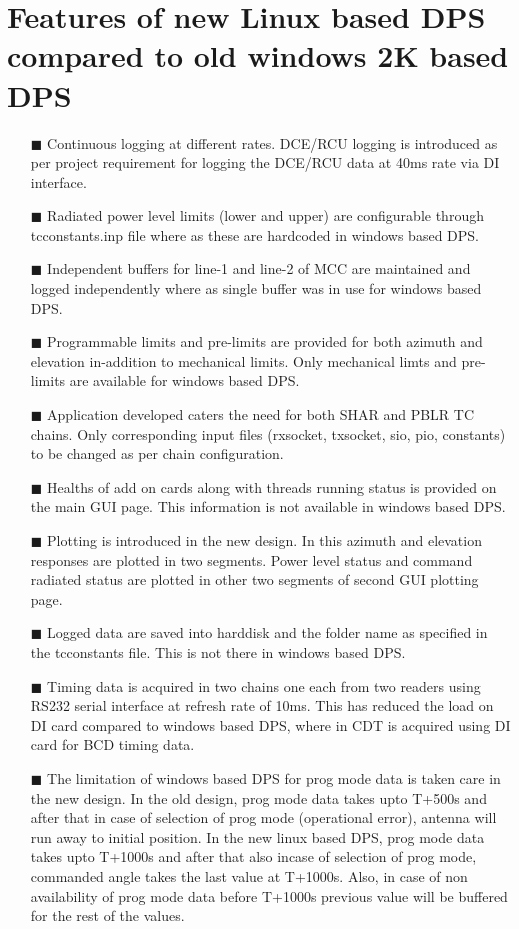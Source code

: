 \chapter{Features of new Linux based DPS compared to old windows 2K based DPS}\label{Chapter9}


\begin{enumerate}
	\item [$\blacksquare$] Continuous logging at different rates. DCE/RCU logging is introduced as per project requirement for logging the DCE/RCU data at 40ms rate via DI interface.
	\item [$\blacksquare$] Radiated power level limits (lower and upper) are configurable through tcconstants.inp file where as these are hardcoded in windows based DPS. 
	\item [$\blacksquare$] Independent buffers for line-1 and line-2 of MCC are maintained and logged independently where as single buffer was in use for windows based DPS. 
	\item [$\blacksquare$] Programmable limits and pre-limits are provided for both azimuth and elevation in-addition to mechanical limits. Only mechanical limts and pre-limits are available for windows based DPS. 
	\item [$\blacksquare$] Application developed caters the need for both SHAR and PBLR TC chains. Only corresponding input files (rxsocket, txsocket, sio, pio, constants) to be changed as per chain configuration. 
	\item [$\blacksquare$] Healths of add on cards along with threads running status is provided on the main GUI page. This information is not available in windows based DPS.
	\item [$\blacksquare$] Plotting is introduced in the new design. In this azimuth and elevation responses are plotted in two segments. Power level status and command radiated status are plotted in other two segments of second GUI plotting page.
	\item [$\blacksquare$] Logged data are saved into harddisk and the folder name as specified in the tcconstants file. This is not there in windows based DPS.
	\item [$\blacksquare$] Timing data is acquired in two chains one each from two readers using RS232 serial interface at refresh rate of 10ms. This has reduced the load on DI card compared to windows based DPS, where in CDT is acquired using DI card for BCD timing data. 
	\item [$\blacksquare$] The limitation of windows based DPS for prog mode data is taken care in the new design. In the old design, prog mode data takes upto T+500s and after that in case of selection of prog mode (operational error), antenna will run away to initial position. In the new linux based DPS, prog mode data takes upto T+1000s and after that also incase of selection of prog mode, commanded angle takes the last value at T+1000s. Also, in case of non availability of prog mode data before T+1000s previous value will be buffered for the rest of the values. 

\end{enumerate}
